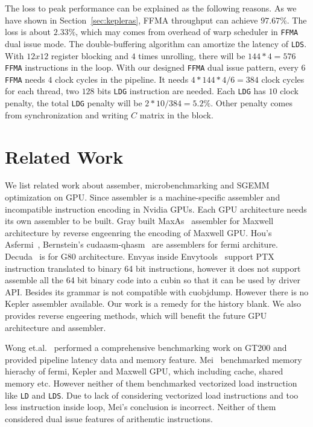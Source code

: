 \documentclass{sig-alternate-05-2015}
\begin{document}
The loss to peak performance can be explained as the following reasons. As we have shown in Section~\ref{sec:kepleras}, FFMA throughput can achieve $97.67\%$. The loss is about $2.33\%$, which may comes from overhead of warp scheduler in {\tt FFMA} dual issue mode. The double-buffering algorithm can amortize the latency of {\tt LDS}.
With $12x12$ register blocking and $4$ times unrolling, there will be $144*4=576$ {\tt FFMA} instructions in the loop.
With our designed {\tt FFMA} dual issue pattern, every $6$ {\tt FFMA} needs $4$ clock cycles in the pipeline.
It needs $4*144*4/6=384$ clock cycles for each thread,  two $128$ bits {\tt LDG} instruction are needed.
Each {\tt LDG} has $10$ clock penalty, the total {\tt LDG} penalty will be $2*10/384 = 5.2\%$. Other penalty comes from synchronization and writing $C$ matrix in the block.
%
\section{Related Work}
We list related work about assember, microbenchmarking and SGEMM optimization on GPU.
Since assembler is a machine-specific assembler and incompatible instruction encoding in Nvidia
GPUs. Each GPU architecture needs its own assembler to be built.
Gray built MaxAs~\cite{maxas} assembler for Maxwell architecture by reverse engeenring the encoding of Maxwell GPU.
Hou's Asfermi~\cite{asfermi}, Bernstein's cudaasm-qhasm~\cite{bernstein2012usable} are assemblers for fermi architure.
Decuda~\cite{decuda} is for G80 architecture.
Envyas inside Envytools~\cite{envytools} support PTX instruction translated to binary 64 bit
instructions, however it does not support assemble all the 64 bit binary code into a cubin so that
it can be used by driver API. Besides its grammar is not compatible with cuobjdump.
However there is no Kepler assembler available. Our work is a remedy for the history blank.
We also provides reverse engeering methods, which will benefit the future GPU architecture and assembler.

Wong et.al.~\cite{wong} performed a comprehensive benchmarking work on GT200 and provided pipeline latency data and
memory feature. Mei~\cite{mei} benchmarked memory hierachy
of fermi, Kepler and Maxwell GPU, which including cache, shared memory etc. However neither of them benchmarked
vectorized load instruction like {\tt LD} and {\tt LDS}. Due to lack of considering vectorized load instructions and too
less instruction inside loop, Mei's conclusion is incorrect. Neither of them considered dual issue features of
arithemtic instructions.
\end{document}

